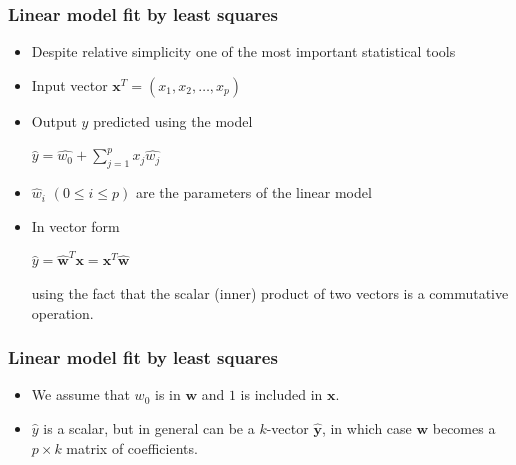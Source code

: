 \documentclass[notes]{beamer}          %
\newcommand{\vect}[1]{\bm{#1}}
\begin{document}
\begin{frame}
\frametitle{Linear model fit by least squares}
    \begin{itemize}
        \item Despite relative simplicity one of the most important statistical tools
        \item Input vector $\vect{x}^T = (x_1, x_2, \ldots, x_p)$
        \item Output $y$ predicted using the model \\
            \begin{center}
            $\hat{y} = \hat{w_0} + \sum_{j=1}^{p} x_j \hat{w_j}$
            \end{center}
        \item $\hat{w}_i$ $ (0 \leq i \leq p)$ are the parameters of the linear model
        \item In vector form
            \begin{center}
            $\hat{y} = \hat{\vect{w}}^T\vect{x} = \vect{x}^T \hat{\vect{w}}$
            \end{center}
            using the fact that the scalar (inner) product of two vectors is a commutative operation.
    \end{itemize}
\end{frame}

\begin{frame}
\frametitle{Linear model fit by least squares}
    \begin{itemize}
        \item  We assume that $w_0$ is in $\vect{w}$ and $1$ is included in $\vect{x}$.
        \item $\hat{y}$ is a scalar, but in general can be a $k$-vector $\hat{\vect{y}}$, in which case $\vect{w}$ becomes a $p \times k$ matrix of coefficients.
    \end{itemize}
\end{frame}
\end{document}
